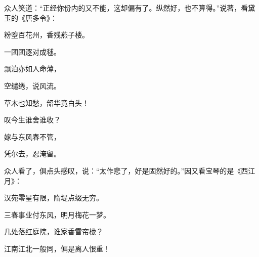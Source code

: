 \begin{parag}

    众人笑道：“正经你份内的又不能，这却偏有了。纵然好，也不算得。”说著，看黛玉的《唐多令》：
\end{parag}
\begin{poem}

    \begin{pl}

        粉堕百花州，香残燕子楼。
    \end{pl}
    \begin{pl}

        一团团逐对成毬。
    \end{pl}
    \begin{pl}

        飘泊亦如人命薄，
    \end{pl}
    \begin{pl}

        空缱绻，说风流。
    \end{pl}
    \begin{pl}

        草木也知愁，韶华竟白头！
    \end{pl}
    \begin{pl}

        叹今生谁舍谁收？
    \end{pl}
    \begin{pl}

        嫁与东风春不管，
    \end{pl}
    \begin{pl}

        凭尔去，忍淹留。
    \end{pl}
\end{poem}

\begin{parag}

    众人看了，俱点头感叹，说：“太作悲了，好是固然好的。”因又看宝琴的是《西江月》：
\end{parag}
\begin{poem}

    \begin{pl}

        汉苑零星有限，隋堤点缀无穷。
    \end{pl}
    \begin{pl}

        三春事业付东风，明月梅花一梦。
    \end{pl}
    \begin{pl}

        几处落红庭院，谁家香雪帘栊？
    \end{pl}
    \begin{pl}

        江南江北一般同，偏是离人恨重！
    \end{pl}
\end{poem}

